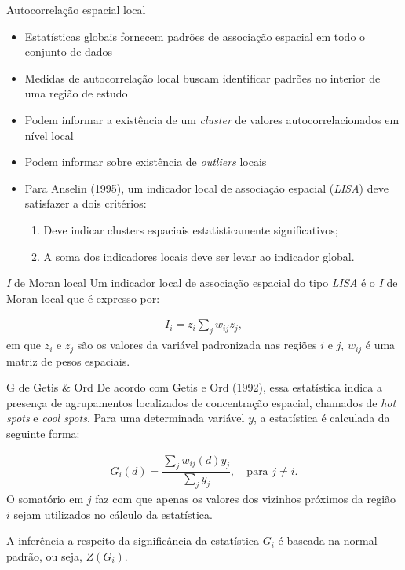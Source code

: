 \documentclass[aspectratio=169]{beamer}
\begin{document}
\begin{frame}{Autocorrelação espacial local}
	\begin{itemize}
		\item Estatísticas globais fornecem padrões de associação espacial em todo o conjunto de dados
		\item Medidas de autocorrelação local buscam identificar padrões no interior de uma região de estudo  
		\item Podem informar a existência de um \textit{cluster} de valores autocorrelacionados em nível local
		\item Podem informar sobre existência de \textit{outliers} locais
		\item Para Anselin (1995), um indicador local de associação espacial (\textit{LISA}) deve satisfazer a dois critérios:
		\vspace{0.25cm}
		\begin{enumerate}
			\item Deve indicar clusters espaciais estatisticamente significativos;
			\item A soma dos indicadores locais deve ser levar ao indicador global.
		\end{enumerate}
	\end{itemize}
\end{frame}

\begin{frame}{\textit{I} de Moran local}
	Um indicador local de associação espacial do tipo \textit{LISA} é o \textit{I} de Moran local que é expresso por: 
	\begin{block}{}
		\small
		\vspace{0.25cm}
		\begin{align*}
		I_i = z_i \sum_{j}^{} w_{ij} z_j,
		\end{align*}
		\noindent \small em que $z_i$ e $z_j$ são os valores da variável padronizada nas regiões $i$ e $j$, $w_{ij}$ é uma matriz de pesos espaciais.
	\end{block}	
\end{frame}

\begin{frame}{G de Getis \& Ord}
    De acordo com Getis e Ord (1992), essa estatística indica a presença de agrupamentos localizados de concentração espacial, chamados de \textit{hot spots} e \textit{cool spots}. Para uma determinada variável $y$, a estatística é calculada da seguinte forma:
    
    \begin{block}{}
    \begin{align*}  
    G_i(d) = \dfrac{\sum_{j} w_{ij}(d) y_j}{\sum_{j}  y_j},\quad \text{para  $j \neq i$}.    
    \end{align*}
    O somatório em $j$ faz com que apenas os valores dos vizinhos próximos da região $i$ sejam utilizados no cálculo da estatística. 
    \end{block}
    
    A inferência a respeito da significância da estatística $G_i$ é baseada na normal padrão, ou seja, $Z(G_i)$. 
\end{frame}
\end{document}
